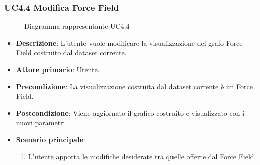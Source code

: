 \newpage
\subsubsection{UC4.4 Modifica Force Field}
\label{ssub:uc4.4}
\begin{figure}[h]
    \centering
    \caption{Diagramma rappresentante UC4.4}
    \label{fig:UC4.4}
\end{figure}


\begin{itemize}
    \item \textbf{Descrizione}: L’utente vuole modificare la visualizzazione del grafo Force Field
                                costruito dal dataset corrente.
	
    \item \textbf{Attore primario}: Utente.
    
    \item \textbf{Precondizione}:   La visualizzazione costruita dal dataset corrente è un Force Field.

    \item \textbf{Postcondizione}:  Viene aggiornato il grafico costruito e visualizzato con i nuovi parametri.

	\item \textbf{Scenario principale}:
		\begin{enumerate}
            \item L'utente apporta le modifiche desiderate tra quelle offerte dal Force Field.
        \end{enumerate}
\end{itemize}

